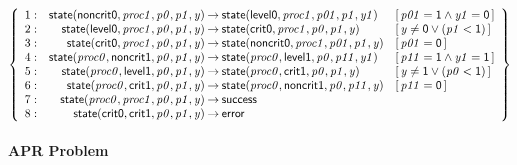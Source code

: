 \documentclass[a4paper]{article}
\newcommand{\symb}[1]{\mathsf{#1}}
\newcommand{\var}[1]{\mathit{#1}}
\newcommand{\Constraint}[1]{[\, #1 \,]}
\begin{document}
\[
\left\{
\begin{array}{rr@{\>}c@{\>}ll}
\mathrm{1} : 
 & \symb{state}(\symb{noncrit0},\var{proc1},\var{p0},\var{p1},\var{y})
 & \to 
 & \symb{state}(\symb{level0},\var{proc1},\var{p01},\var{p1},\var{y1})
 & \Constraint{\var{p01} = \symb{1} \land \var{y1} = \symb{0}}\\

\mathrm{2} : 
 & \symb{state}(\symb{level0},\var{proc1},\var{p0},\var{p1},\var{y})
 & \to 
 & \symb{state}(\symb{crit0},\var{proc1},\var{p0},\var{p1},\var{y})
 & \Constraint{\var{y} \ne \symb{0} \lor (\var{p1} < \symb{1})}\\

\mathrm{3} : 
 & \symb{state}(\symb{crit0},\var{proc1},\var{p0},\var{p1},\var{y})
 & \to 
 & \symb{state}(\symb{noncrit0},\var{proc1},\var{p01},\var{p1},\var{y})
 & \Constraint{\var{p01} = \symb{0}}\\

\mathrm{4} : 
 & \symb{state}(\var{proc0},\symb{noncrit1},\var{p0},\var{p1},\var{y})
 & \to 
 & \symb{state}(\var{proc0},\symb{level1},\var{p0},\var{p11},\var{y1})
 & \Constraint{\var{p11} = \symb{1} \land \var{y1} = \symb{1}}\\

\mathrm{5} : 
 & \symb{state}(\var{proc0},\symb{level1},\var{p0},\var{p1},\var{y})
 & \to 
 & \symb{state}(\var{proc0},\symb{crit1},\var{p0},\var{p1},\var{y})
 & \Constraint{\var{y} \ne \symb{1} \lor (\var{p0} < \symb{1})}\\

\mathrm{6} : 
 & \symb{state}(\var{proc0},\symb{crit1},\var{p0},\var{p1},\var{y})
 & \to 
 & \symb{state}(\var{proc0},\symb{noncrit1},\var{p0},\var{p11},\var{y})
 & \Constraint{\var{p11} = \symb{0}}\\

\mathrm{7} : 
 & \symb{state}(\var{proc0},\var{proc1},\var{p0},\var{p1},\var{y})
 & \to 
 & \symb{success}\\

\mathrm{8} : 
 & \symb{state}(\symb{crit0},\symb{crit1},\var{p0},\var{p1},\var{y})
 & \to 
 & \symb{error}\\

\end{array}
\right\}
\]



\paragraph{APR Problem}
\end{document}
